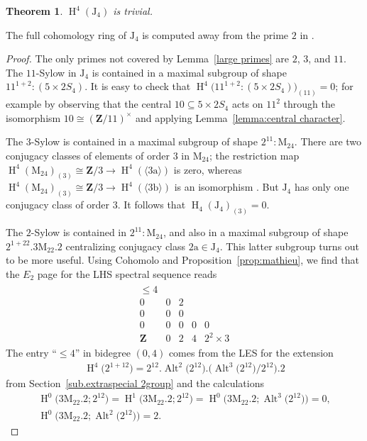 \documentclass[pdftex]{sigma}
\numberwithin{equation}{section}
\newtheorem{Theorem}{Theorem}[section]
\newcommand\bZ{\mathbf Z}
\newcommand\ra{\mathrm a}
\newcommand\rb{\mathrm b}
\newcommand\rJ{\mathrm J}
\newcommand\rM{\mathrm M}
\DeclareMathOperator\homology{H}
\renewcommand\H{\homology}
\newcommand\<\langle
\renewcommand\>\rangle
\DeclareMathOperator\Alt{Alt}
\begin{document}
\begin{Theorem} $\H^4(\rJ_4)$ is trivial.
\end{Theorem}

The full cohomology ring of $\rJ_4$ is computed away from the prime $2$ in \cite{MR1198410}.

\begin{proof} The only primes not covered by Lemma~\ref{large primes} are $2$, $3$, and $11$.
 The $11$-Sylow in $\rJ_4$ is contained in a maximal subgroup of shape $11^{1+2}:(5\times 2S_4)$. It is easy to check that $\H^4\big(11^{1+2}:(5\times 2S_4)\big)_{(11)} = 0$; for example by observing that the central $10 \subseteq 5\times 2S_4$ acts on $11^2$ through the isomorphism $10 \cong (\bZ/11)^\times$ and applying Lemma~\ref{lemma:central character}.

 The $3$-Sylow is contained in a maximal subgroup of shape $2^{11}:\rM_{24}$. There are two conjugacy classes of elements of order $3$ in $\rM_{24}$; the restriction map $\H^4(\rM_{24})_{(3)} \cong \bZ/3 \to \H^4(\langle 3\ra\rangle)$ is zero, whereas $\H^4(\rM_{24})_{(3)} \cong \bZ/3 \to \H^4(\langle 3\rb\rangle)$ is an isomorphism \cite{GPRV}. But $\rJ_4$ has only one conjugacy class of order $3$. It follows that $\H_4(\rJ_4)_{(3)} = 0$.

 The $2$-Sylow is contained in $2^{11}:\rM_{24}$, and also in a maximal subgroup of shape $2^{1+22}.3\rM_{22}.2$ centralizing conjugacy class $2\ra \in \rJ_4$. This latter subgroup turns out to be more useful. Using Cohomolo and Proposition~\ref{prop:mathieu}, we find that the $E_2$ page for the LHS spectral sequence reads
 \begin{gather*} \begin{array}{ccccc}
 \leq 4 \\
 0 & 0 & 2 \\
 0 & 0 & 0 \\
 0 & 0 & 0 & 0 & 0 \\
 \bZ & 0 & 2 & 4 & 2^2 \times 3
 \end{array} \end{gather*}
 The entry ``$\leq 4$'' in bidegree $(0,4)$ comes from the LES for the extension
 \begin{gather*} \H^4\big(2^{1+12}\big) = 2^{12}.\Alt^2\big(2^{12}\big).\big(\Alt^3\big(2^{12}\big)/2^{12}\big).2 \end{gather*}
 from Section~\ref{sub.extraspecial 2group} and the calculations
 \begin{gather*} \H^0\big(3\rM_{22}.2; 2^{12}\big) = \H^1\big(3\rM_{22}.2; 2^{12}\big) = \H^0\big(3\rM_{22}.2; \Alt^3\big(2^{12}\big)\big) = 0, \\ \H^0\big(3\rM_{22}.2; \Alt^2\big(2^{12}\big)\big) = 2. \end{gather*}


\end{proof}
\end{document}
